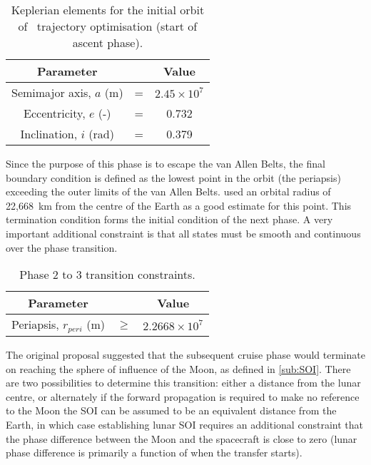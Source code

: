 \begin{table}[h]
\caption{Keplerian elements for the initial orbit of \BW\ trajectory optimisation (start of ascent phase).}
\label{tab:Phase-2-constraints}
\centering
\begin{tabular} {ccc}\toprule
Parameter & & Value\\\midrule
Semimajor axis, $a$ (m) &=& $2.45\times 10^7$\\
Eccentricity, $e$ (-) &=& 0.732\\
Inclination, $i$ (rad) &=& 0.379\\\bottomrule
\end{tabular}
\end{table}

Since the purpose of this phase is to escape the van Allen Belts, the final boundary condition is defined as the lowest point in the orbit (the periapsis) exceeding the outer limits of the van Allen Belts. \textcite{Letterio_thesis} used an orbital radius of 22,668~km from the centre of the Earth as a good estimate for this point. This termination condition forms the initial condition of the next phase. A very important additional constraint is that all states must be smooth and continuous over the phase transition.

\begin{table}[h]
\caption{Phase 2 to 3 transition constraints.}
\label{tab:Phase-2-3-constraints}
\centering
\begin{tabular} {ccc}\toprule
Parameter & & Value\\\midrule
Periapsis, $r_{peri}$ (m) &$\ge$& $2.2668\times 10^7$\\\bottomrule
\end{tabular}
\end{table}

The original proposal \parencite{Roeser2006} suggested that the subsequent cruise phase would terminate on reaching the sphere of influence of the Moon, as defined in \autoref{sub:SOI}. There are two possibilities to determine this transition: either a distance from the lunar centre, or alternately if the forward propagation is required to make no reference to the Moon the SOI can be assumed to be an equivalent distance from the Earth, in which case establishing lunar SOI requires an additional constraint that the phase difference between the Moon and the spacecraft is close to zero (lunar phase difference is primarily a function of when the transfer starts). 

